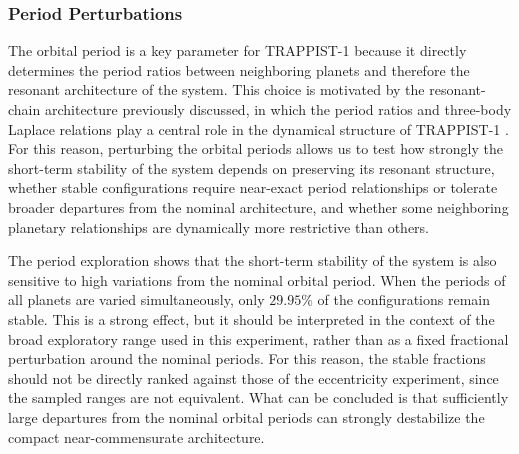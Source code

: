 \documentclass{aa}
\begin{document}
\subsubsection{Period Perturbations}

The orbital period is a key parameter for TRAPPIST-1 because it directly determines the period ratios between neighboring planets and therefore the resonant architecture of the system. This choice is motivated by the resonant-chain architecture previously discussed, in which the period ratios and three-body Laplace relations play a central role in the dynamical structure of TRAPPIST-1 \citep{2017NatAs...1E.129L}. For this reason, perturbing the orbital periods allows us to test how strongly the short-term stability of the system depends on preserving its resonant structure, whether stable configurations require near-exact period relationships or tolerate broader departures from the nominal architecture, and whether some neighboring planetary relationships are dynamically more restrictive than others.

\begin{table}%
\centering
\caption{Stability results for the exploratory orbital-period perturbations. Each configuration was integrated for 100 years, with $10^4$ simulations per experiment. Periods were sampled from a lower bound equal to 20 times the timestep used as reference for \textit{WHFast}, up to twice the nominal period of the perturbed planet.}
\label{tab:period_exploration}
\end{table}

The period exploration shows that the short-term stability of the system is also sensitive to high variations from the nominal orbital period. When the periods of all planets are varied simultaneously, only $29.95\%$ of the configurations remain stable. This is a strong effect, but it should be interpreted in the context of the broad exploratory range used in this experiment, rather than as a fixed fractional perturbation around the nominal periods. For this reason, the stable fractions should not be directly ranked against those of the eccentricity experiment, since the sampled ranges are not equivalent. What can be concluded is that sufficiently large departures from the nominal orbital periods can strongly destabilize the compact near-commensurate architecture.
\end{document}
